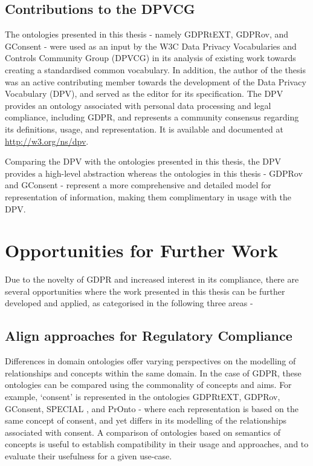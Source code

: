 \subsection*{Contributions to the DPVCG}
The ontologies presented in this thesis - namely GDPRtEXT, GDPRov, and GConsent - were used as an input by the W3C Data Privacy Vocabularies and Controls Community Group (DPVCG) in its analysis of existing work towards creating a standardised common vocabulary.
In addition, the author of the thesis was an active contributing member towards the development of the Data Privacy Vocabulary (DPV), and served as the editor for its specification.
The DPV provides an ontology associated with personal data processing and legal compliance, including GDPR, and represents a community consensus regarding its definitions, usage, and representation.
It is available and documented at \url{http://w3.org/ns/dpv}.

Comparing the DPV with the ontologies presented in this thesis, the DPV provides a high-level abstraction whereas the ontologies in this thesis - GDPRov and GConsent - represent a more comprehensive and detailed model for representation of information, making them complimentary in usage with the DPV.

\section{Opportunities for Further Work}\label{sec:conclusion-future-work}
Due to the novelty of GDPR and increased interest in its compliance, there are several opportunities where the work presented in this thesis can be further developed and applied, as categorised in the following three areas -
\subsection*{Align approaches for Regulatory Compliance}
Differences in domain ontologies offer varying perspectives on the modelling of relationships and concepts within the same domain. In the case of GDPR, these ontologies can be compared using the commonality of concepts and aims. For example, `consent' is represented in the ontologies GDPRtEXT, GDPRov, GConsent, SPECIAL \cite{kirrane_scalable_2018}, and PrOnto \cite{palmirani_pronto_2018} - where each representation is based on the same concept of consent, and yet differs in its modelling of the relationships associated with consent. A comparison of ontologies based on semantics of concepts is useful to establish compatibility in their usage and approaches, and to evaluate their usefulness for a given use-case.

